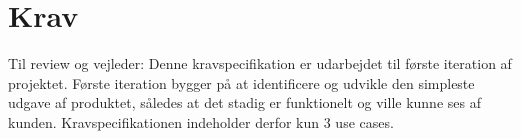 \chapter{Krav}
Til review og vejleder:\newline
Denne kravspecifikation er udarbejdet til første iteration af projektet. Første iteration bygger på at identificere og udvikle den simpleste udgave af produktet, således at det stadig er funktionelt og ville kunne ses af kunden. Kravspecifikationen indeholder derfor kun 3 use cases.








